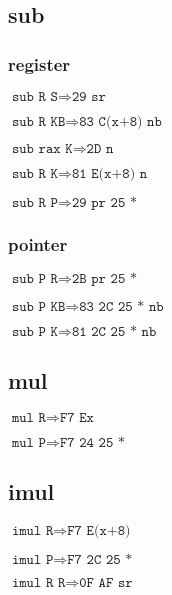 \documentclass{article}
\begin{document}
\subsection{sub}
\begin{minipage}{\textwidth}

\subsubsection{register}

$\texttt{sub R S} \Rightarrow \texttt{29 sr}$

$\texttt{sub R KB} \Rightarrow \texttt{83 C(x+8) nb}$

$\texttt{sub rax K} \Rightarrow \texttt{2D n}$

$\texttt{sub R K} \Rightarrow \texttt{81 E(x+8) n}$

$\texttt{sub R P} \Rightarrow \texttt{29 pr 25 *}$


\subsubsection{pointer}

$\texttt{sub P R} \Rightarrow \texttt{2B pr 25 *}$

$\texttt{sub P KB} \Rightarrow \texttt{83 2C 25 * nb}$

$\texttt{sub P K} \Rightarrow \texttt{81 2C 25 * nb}$

\end{minipage}


\subsection{mul}
\begin{minipage}{\textwidth}

$\texttt{mul R} \Rightarrow \texttt{F7 Ex}$

$\texttt{mul P} \Rightarrow \texttt{F7 24 25 *}$

\end{minipage}


\subsection{imul}
\begin{minipage}{\textwidth}

$\texttt{imul R} \Rightarrow \texttt{F7 E(x+8)}$

$\texttt{imul P} \Rightarrow \texttt{F7 2C 25 *}$

$\texttt{imul R R} \Rightarrow \texttt{0F AF sr}$

\end{minipage}
\end{document}
